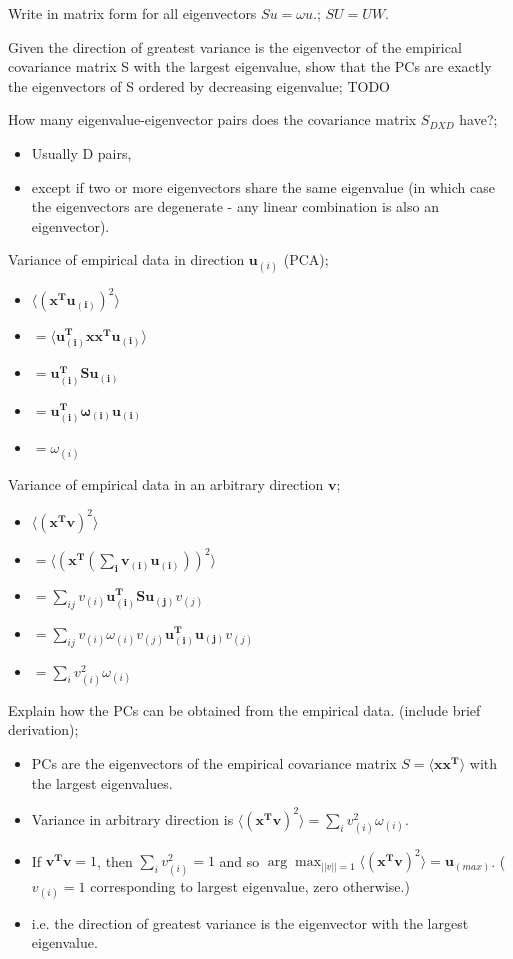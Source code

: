 \documentclass{article}
\begin{document}
Write in matrix form for all eigenvectors $Su = \omega u$.; $SU=UW$.

Given the direction of greatest variance is the eigenvector of the empirical covariance matrix S with the largest eigenvalue, show that the PCs are exactly the eigenvectors of S ordered by decreasing eigenvalue; TODO

How many eigenvalue-eigenvector pairs does the covariance matrix $S_{DXD}$ have?; \begin{itemize} \item Usually D pairs, \item except if two or more eigenvectors share the same eigenvalue (in which case the eigenvectors are degenerate - any linear combination is also an eigenvector).  \end{itemize}

Variance of empirical data in direction $\mathbf{u}_{(i)}$ (PCA); \begin{itemize} \item $\langle (\mathbf{x^Tu_{(i)}})^2\rangle $ \item $= \langle \mathbf{u_{(i)}^Txx^Tu_{(i)}}\rangle $ \item $=\mathbf{u_{(i)}^TSu_{(i)}}$ \item $=\mathbf{u_{(i)}^T\omega_{(i)}u_{(i)}}$ \item $=\omega_{(i)}$ \end{itemize}

Variance of empirical data in an arbitrary direction $\mathbf{v}$; \begin{itemize} \item $\langle (\mathbf{x^Tv})^2\rangle $ \item $= \langle (\mathbf{x^T(\sum_i v_{(i)}\mathbf{u}_{(i)})})^2\rangle $ \item $=\sum_{ij}v_{(i)}\mathbf{u_{(i)}^TSu_{(j)}}v_{(j)}$ \item $=\sum_{ij}v_{(i)}\omega_{(i)}v_{(j)}\mathbf{u_{(i)}^Tu_{(j)}}v_{(j)}$ \item $=\sum_i v_{(i)}^2\omega_{(i)}$ \end{itemize}

Explain how the PCs can be obtained from the empirical data. (include brief derivation); \begin{itemize} \item PCs are the eigenvectors of the empirical covariance matrix $S=\langle\mathbf{xx^T}\rangle$ with the largest eigenvalues.  \item Variance in arbitrary direction is $\langle (\mathbf{x^Tv})^2\rangle =\sum_i v_{(i)}^2\omega_{(i)}$.  \item If $\mathbf{v^Tv}=1$, then $\sum_i v_{(i)}^2=1$ and so $\arg\max_{||v||=1} \langle (\mathbf{x^Tv})^2\rangle = \mathbf{u}_{(max)}$. ($v_{(i)}=1$ corresponding to largest eigenvalue, zero otherwise.) \item i.e. the direction of greatest variance is the eigenvector with the largest eigenvalue.  \end{itemize}
\end{document}

